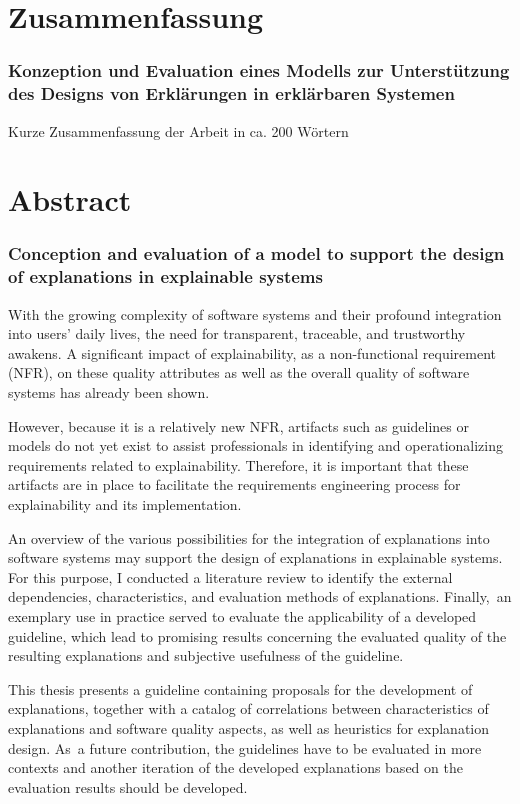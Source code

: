 \chapter*{Zusammenfassung}

\subsection*{Konzeption und Evaluation eines Modells zur Unterstützung des Designs von Erklärungen in erklärbaren Systemen}

Kurze Zusammenfassung der Arbeit in ca. 200 Wörtern

\clearpage

\chapter*{Abstract}

\subsection*{Conception and evaluation of a model to support the design of explanations in explainable systems}

With the growing complexity of software systems and their profound integration into users' daily lives, the need for transparent, traceable, and trustworthy awakens. A significant impact of explainability, as a non-functional requirement (NFR), on these quality attributes as well as the overall quality of software systems has already been shown.

However, because it is a relatively new NFR, artifacts such as guidelines or models do not yet exist to assist professionals in identifying and operationalizing requirements related to explainability. Therefore, it is important that these artifacts are in place to facilitate the requirements engineering process for explainability and its implementation.

An overview of the various possibilities for the integration of explanations into software systems may support the design of explanations in explainable systems. For this purpose, I conducted a literature review to identify the external dependencies, characteristics, and evaluation methods of explanations. Finally, an exemplary use in practice served to evaluate the applicability of a developed guideline, which lead to promising results concerning the evaluated quality of the resulting explanations and subjective usefulness of the guideline. 

This thesis presents a guideline containing proposals for the development of explanations, together with a catalog of correlations between characteristics of explanations and software quality aspects, as well as heuristics for explanation design. As a future contribution, the guidelines have to be evaluated in more contexts and another iteration of the developed explanations based on the evaluation results should be developed.

\clearpage